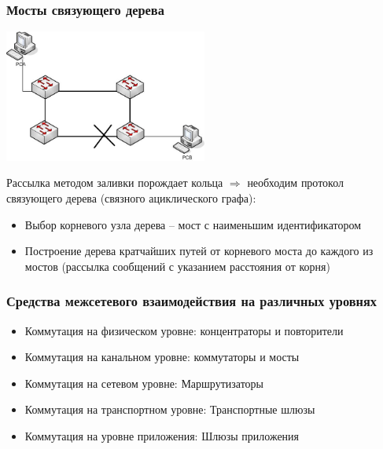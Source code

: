 \documentclass[utf8]{beamer}
\begin{document}
\begin{frame}
\frametitle{Мосты связующего дерева}
\begin{center}
\includegraphics[width=0.5\textwidth]{pic/SPT-Loop.jpg}
\end{center}
Рассылка методом заливки порождает кольца $\Rightarrow$ необходим протокол связующего дерева (связного ациклического графа):
\begin{itemize}
 \item Выбор корневого узла дерева -- мост с наименьшим идентификатором
 \item Построение дерева кратчайших путей от корневого моста до каждого из мостов (рассылка сообщений с указанием расстояния от корня)
\end{itemize}
\end{frame}
\begin{frame}
\frametitle{Средства межсетевого взаимодействия на различных уровнях}
\begin{itemize}
 \item Коммутация на физическом уровне: концентраторы и повторители
 \item Коммутация на канальном уровне: коммутаторы и мосты
 \item Коммутация на сетевом уровне: Маршрутизаторы
 \item Коммутация на транспортном уровне: Транспортные шлюзы
 \item Коммутация на уровне приложения: Шлюзы приложения
\end{itemize}

\end{frame}
\end{document}
